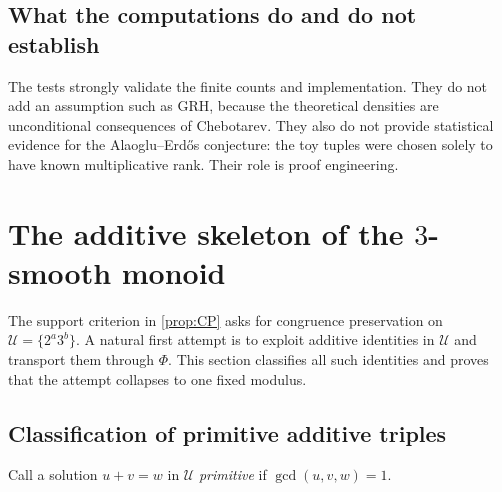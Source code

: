 \documentclass[11pt]{article}
\theoremstyle{definition}
\theoremstyle{remark}
\begin{document}
\subsection{What the computations do and do not establish}

The tests strongly validate the finite counts and implementation.  They do not add an assumption
such as GRH, because the theoretical densities are unconditional consequences of Chebotarev.
They also do not provide statistical evidence for the Alaoglu--Erd\H{o}s conjecture: the toy
tuples were chosen solely to have known multiplicative rank.  Their role is proof engineering.

\section{The additive skeleton of the \texorpdfstring{$3$-smooth}{3-smooth} monoid}
\label{sec:additive}

The support criterion in \cref{prop:CP} asks for congruence preservation on
$\mathcal U=\{2^a3^b\}$.  A natural first attempt is to exploit additive identities in
$\mathcal U$ and transport them through $\Phi$.  This section classifies all such identities
and proves that the attempt collapses to one fixed modulus.

\subsection{Classification of primitive additive triples}

Call a solution $u+v=w$ in $\mathcal U$ \emph{primitive} if
$\gcd(u,v,w)=1$.
\end{document}
